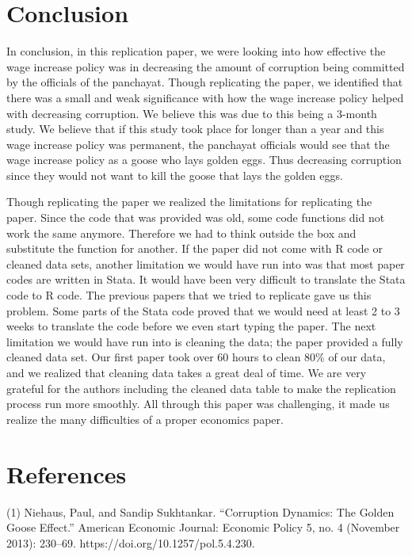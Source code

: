 \documentclass[12pt]{article}
\begin{document}
\section{Conclusion}
In conclusion, in this replication paper, we were looking into how effective the wage increase policy was in decreasing the amount of corruption being committed by the officials of the panchayat. Though replicating the paper, we identified that there was a small and weak significance with how the wage increase policy helped with decreasing corruption. We believe this was due to this being a 3-month study. We believe that if this study took place for longer than a year and this wage increase policy was permanent, the panchayat officials would see that the wage increase policy as a goose who lays golden eggs. Thus decreasing corruption since they would not want to kill the goose that lays the golden eggs.

Though replicating the paper we realized the limitations for replicating the paper. Since the code that was provided was old, some code functions did not work the same anymore. Therefore we had to think outside the box and substitute the function for another. If the paper did not come with R code or cleaned data sets, another limitation we would have run into was that most paper codes are written in Stata. It would have been very difficult to translate the Stata code to R code. The previous papers that we tried to replicate gave us this problem. Some parts of the Stata code proved that we would need at least 2 to 3 weeks to translate the code before we even start typing the paper. The next limitation we would have run into is cleaning the data; the paper provided a fully cleaned data set. Our first paper took over 60 hours to clean 80\% of our data, and we realized that cleaning data takes a great deal of time. We are very grateful for the authors including the cleaned data table to make the replication process run more smoothly. All through this paper was challenging, it made us realize the many difficulties of a proper economics paper. 

\section{References}
(1)
Niehaus, Paul, and Sandip Sukhtankar. “Corruption Dynamics: The Golden Goose Effect.” American Economic Journal: Economic Policy 5, no. 4 (November 2013): 230–69. https://doi.org/10.1257/pol.5.4.230.
\end{document}
